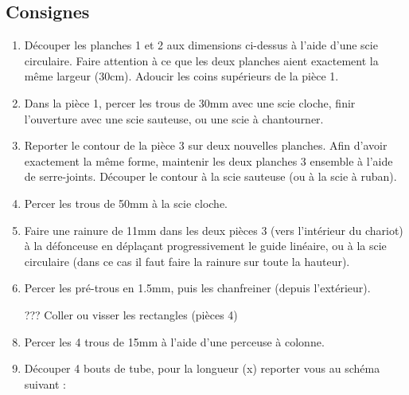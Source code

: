 \documentclass[a4paper,oneside]{article}
\begin{document}
\subsection{Consignes}
\begin{enumerate}
\item Découper les planches 1 et 2 aux dimensions ci-dessus à l'aide d'une scie circulaire.
Faire attention à ce que les deux planches aient exactement la même largeur (30cm).
Adoucir les coins supérieurs de la pièce 1.
\item Dans la pièce 1, percer les trous de 30mm avec une scie cloche, finir l'ouverture avec une scie sauteuse, ou une scie à chantourner.
\item Reporter le contour de la pièce 3 sur deux nouvelles planches.
Afin d'avoir exactement la même forme, maintenir les deux planches 3 ensemble à l'aide de serre-joints.
Découper le contour à la scie sauteuse (ou à la scie à ruban).
\item Percer les trous de 50mm à la scie cloche.
\item Faire une rainure de 11mm dans les deux pièces 3 (vers l'intérieur du chariot) à la défonceuse en déplaçant progressivement le guide linéaire, ou à la scie circulaire (dans ce cas il faut faire la rainure sur toute la hauteur).
\item Percer les pré-trous en 1.5mm, puis les chanfreiner (depuis l'extérieur).


\item[???] Coller ou visser les rectangles (pièces 4)
\item Percer les 4 trous de 15mm à l'aide d'une perceuse à colonne.
\item Découper 4 bouts de tube, pour la longueur (x) reporter vous au schéma suivant :

\begin{figure}[!h]
\captionsetup[subfigure]{labelformat=empty}
\end{figure}
\end{enumerate}
\end{document}
